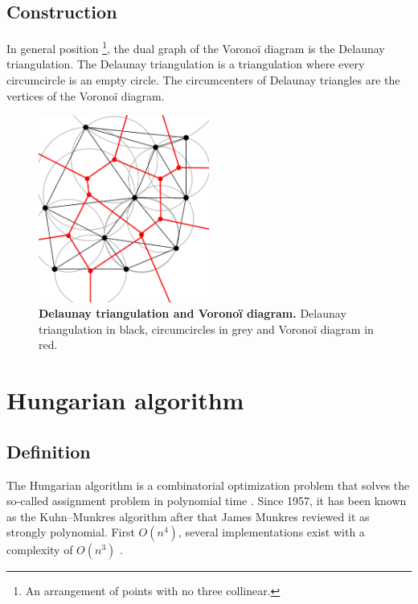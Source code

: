 \begin{appendices}
        \section{Construction}
        In general position \footnote{An arrangement of points with no three collinear.}, the dual graph of the Voronoï diagram is the Delaunay triangulation. The Delaunay triangulation is a triangulation where every circumcircle is an empty circle. The circumcenters of Delaunay triangles are the vertices of the Voronoï diagram.

        \begin{figure}[h!]
        \centering
        \includegraphics[width=0.5\textwidth]{part_1/assets/Appendix_delaunay.png}
        \caption{{\bf Delaunay triangulation and Voronoï diagram.} Delaunay triangulation in black, circumcircles in grey and Voronoï diagram in red.}
        \end{figure}

    \chapter{Hungarian algorithm}
        \label{appendix_hungarian}

        \section{Definition}
        The Hungarian algorithm is a combinatorial optimization problem that solves the so-called assignment problem in polynomial time \cite{kuhn1955hungarian}. Since 1957, it has been known as the Kuhn–Munkres algorithm \cite{munkres1957algorithms} after that James Munkres reviewed it as strongly polynomial. First $O(n^{4})$, several implementations exist with a complexity of $O(n^{3})$ \cite{edmonds1972theoretical,tomizawa1971some,jonker1987shortest}.


\end{appendices}
